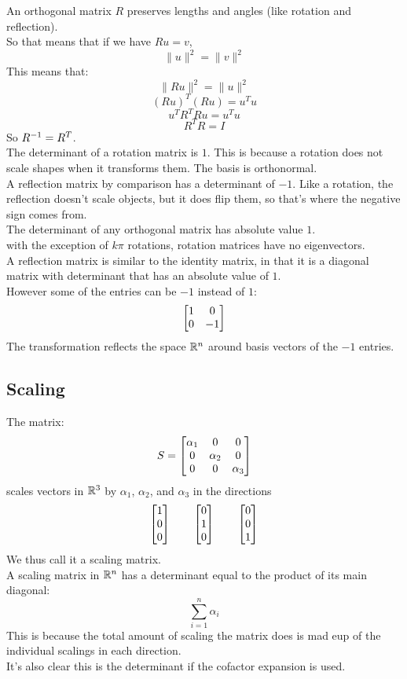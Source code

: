 \documentclass[12pt]{article}
\begin{document}
An orthogonal matrix $R$ preserves lengths and angles
(like rotation and reflection). \\
So that means that if we have $Ru = v$,
\[ \|u\|^2 = \|v\|^2 \]
This means that:
\[ \|Ru\|^2 = \|u\|^2 \]
\[ (Ru)^T(Ru) = u^Tu \]
\[ u^TR^TRu = u^Tu \]
\[ R^TR = I \]
So $R^{-1} = R^T$. \\

The determinant of a rotation matrix
is $1$.
This is because a rotation does not scale
shapes when it transforms them.
The basis is orthonormal. \\

A reflection matrix by comparison has a determinant
of $-1$. 
Like a rotation, the reflection doesn't scale objects,
but it does flip them, so that's where the negative
sign comes from. \\

The determinant of any orthogonal matrix
has absolute value $1$. \\

with the exception of $k\pi$ rotations,
rotation matrices have no eigenvectors. \\

A reflection matrix is similar to the identity
matrix, in that it is a diagonal matrix
with determinant that has an absolute
value of $1$. \\
However some of the entries can be $-1$
instead of $1$:
\[ \begin{bmatrix} 1 & 0 \\ 0 & -1 \end{bmatrix} \]
The transformation reflects the space $\mathbb{R}^n$
around basis vectors of the $-1$ entries.

\newpage

\subsection*{Scaling}

The matrix:
\[ S = \begin{bmatrix} \alpha_1 & 0 & 0 \\ 0 & \alpha_2 & 0 \\ 0 & 0 & \alpha_3 \end{bmatrix} \]
scales vectors in $\mathbb{R}^3$
by $\alpha_1$, $\alpha_2$, and $\alpha_3$
in the directions
\[ \begin{bmatrix} 1 \\ 0 \\ 0 \end{bmatrix}
\qquad \begin{bmatrix} 0 \\ 1 \\ 0 \end{bmatrix}
\qquad \begin{bmatrix} 0 \\ 0 \\ 1 \end{bmatrix} \]
We thus call it a scaling matrix. \\

A scaling matrix in $\mathbb{R}^n$ has a determinant equal 
to the product of its main diagonal:
\[ \sum_{i=1}^{n}\alpha_i\]
This is because the total amount of scaling
the matrix does is mad eup of the individual
scalings in each direction. \\
It's also clear this is the determinant if the cofactor
expansion is used. \\
\end{document}
